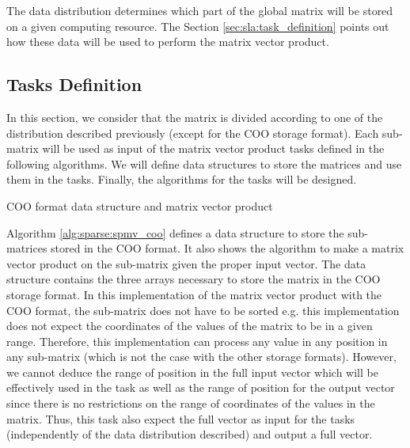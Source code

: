 The data distribution determines which part of the global matrix will be stored on a given computing resource.
The Section \ref{sec:sla:task_definition} points out how these data will be used to perform the matrix vector product.

\subsection{Tasks Definition \label{sec:sla:task_definition}}

In this section, we consider that the matrix is divided according to one of the distribution described previously (except for the COO storage format).
Each sub-matrix will be used as input of the matrix vector product tasks defined in the following algorithms.
We will define data structures to store the matrices and use them in the tasks.
Finally, the algorithms for the tasks will be designed.


\begin{algorithm}[h]
	\DontPrintSemicolon
	\SetAlgoVlined
	\caption{COO format data structure and matrix vector product\label{alg:sparse:spmv_coo}}

	\;
\end{algorithm}

Algorithm \ref{alg:sparse:spmv_coo} defines a data structure to store the sub-matrices stored in the COO format.
It also shows the algorithm to make a matrix vector product on the sub-matrix given the proper input vector.
The data structure contains the three arrays necessary to store the matrix in the COO storage format.
In this implementation of the matrix vector product with the COO format, the sub-matrix does not have to be sorted e.g. this implementation does not expect the coordinates of the values of the matrix to be in a given range.
Therefore, this implementation can process any value in any position in any sub-matrix (which is not the case with the other storage formats).
However, we cannot deduce the range of position in the full input vector which will be effectively used in the task as well as the range of position for the output vector since there is no restrictions on the range of coordinates of the values in the matrix.
Thus, this task also expect the full vector as input for the tasks (independently of the data distribution described) and output a full vector.

